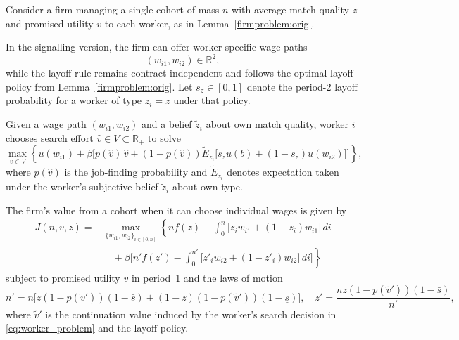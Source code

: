 \begin{definition} \label{def:signalling}
Consider a firm managing a single cohort of mass $n$ with average match quality $z$ and promised utility $v$ to each worker, as in Lemma~\ref{firmproblem:orig}. 

In the signalling version, the firm can offer worker-specific wage paths
\[
(w_{i1},w_{i2}) \in \mathbb{R}^2,
\]
while the layoff rule remains contract-independent and follows the optimal layoff policy from Lemma~\ref{firmproblem:orig}. Let $s_z \in [0,1]$ denote the period-2 layoff probability for a worker of type $z_i=z$ under that policy.

Given a wage path $(w_{i1},w_{i2})$ and a belief $\tilde{z}_i$ about own match quality, worker $i$ chooses search effort $\hat{v} \in V \subset \mathbb{R}_+$ to solve
\begin{equation}
\max_{\hat{v} \in V} \left\{ 
u(w_{i1})
+ \beta \Big[
p(\hat{v})\,\hat{v}
+ (1-p(\hat{v})) \tilde{E}_{z_i} \big[ s_{z} u(b) + (1-s_{z}) u(w_{i2}) \big]
\Big]
\right\},
\label{eq:worker_problem}
\end{equation}
where $p(\hat{v})$ is the job-finding probability and $\tilde{E}_{z_i}$ denotes expectation taken under the worker's subjective belief $\tilde{z}_i$ about own type.

The firm’s value from a cohort when it can choose individual wages is given by
\begin{equation}
\begin{split}
J(n,v,z) = & \max_{\{w_{i1},w_{i2}\}_{i\in[0,n]}} 
\left\{ n f(z) - \int_0^n \big[ z_i w_{i1} + (1-z_i) w_{i1} \big]\,di \right. \\
& \left. \quad + \beta \Big[ n' f(z') - \int_0^{n'} \big[ z'_i w_{i2} + (1-z'_i) w_{i2} \big]\,di \Big] \right\}
\end{split}
\label{eq:firm_signalling_problem}
\end{equation}
subject to promised utility $v$ in period~1 and the laws of motion
\[
n' = n \Big[z(1-p(\tilde{v}'))(1-\bar{s}) + (1-z)(1-p(\tilde{v}'))(1-\underline{s})\Big],
\quad
z' = \frac{n z(1-p(\tilde{v}'))(1-\bar{s}) }{n'},
\]
where $\tilde{v}'$ is the continuation value induced by the worker’s search decision in \eqref{eq:worker_problem} and the layoff policy.
\end{definition}

